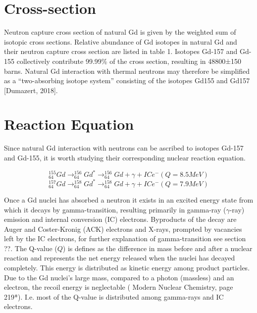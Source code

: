 
\section{Cross-section}
Neutron capture cross section of natural Gd is given by the weighted sum of isotopic cross sections. Relative abundance of Gd isotopes in natural Gd and their neutron capture cross section are listed in table 1. Isotopes Gd-157 and Gd-155 collectively contribute 99.99\% of the cross section, resulting in 48800±150 barns. Natural Gd interaction with thermal neutrons may therefore be simplified as a “two-absorbing isotope system” consisting of the isotopes Gd155 and Gd157 [Dumazert, 2018].

\section{Reaction Equation}
Since natural Gd interaction with neutrons can be ascribed to isotopes Gd-157 and Gd-155, it is worth studying their corresponding nuclear reaction equation.

\begin{equation}
    _{64}^{155}Gd \rightarrow _{64}^{156}Gd^* \rightarrow _{64}^{156}Gd + \gamma + ICe^-     (Q=8.5 MeV)
\end{equation}
\begin{equation}
    _{64}^{157}Gd \rightarrow _{64}^{158}Gd^* \rightarrow _{64}^{158}Gd + \gamma + ICe^-    (Q=7.9 MeV)
\end{equation}

Once a Gd nuclei has absorbed a neutron it exists in an excited energy state from which it decays by gamma-transition, resulting primarily in gamma-ray ($\gamma$-ray) emission and internal conversion (IC) electrons. Byproducts of the decay are Auger and Coster-Kronig (ACK) electrons and X-rays, prompted by vacancies left by the IC electrons, for further explanation of gamma-transition see section ??. The Q-value ($Q$) is defines as the difference in mass before and after a nuclear reaction and represents the net energy released when the nuclei has decayed completely. This energy is distributed as kinetic energy among product particles. Due to the Gd nuclei’s large mass, compared to a photon (massless) and an electron, the recoil energy is neglectable ( Modern Nuclear Chemistry, page 219*). I.e. most of the Q-value is distributed among gamma-rays and IC electrons.


